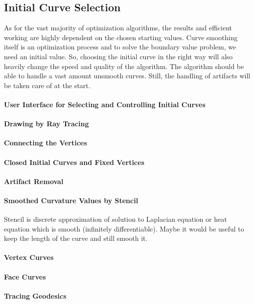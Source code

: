 \documentclass{stdlocal}
\begin{document}
\subsection{Initial Curve Selection} %
\label{sub:initial_curve_selection}
  As for the vast majority of optimization algorithms, the results and efficient working are highly dependent on the chosen starting values.
  Curve smoothing itself is an optimization process and to solve the boundary value problem, we need an initial value.
  So, choosing the initial curve in the right way will also heavily change the speed and quality of the algorithm.
  The algorithm should be able to handle a vast amount unsmooth curves.
  Still, the handling of artifacts will be taken care of at the start.
  \paragraph{User Interface for Selecting and Controlling Initial Curves}
  \paragraph{Drawing by Ray Tracing}
  \paragraph{Connecting the Vertices}
  \paragraph{Closed Initial Curves and Fixed Vertices}
  \paragraph{Artifact Removal}
  \paragraph{Smoothed Curvature Values by Stencil}
    Stencil is discrete approximation of solution to Laplacian equation or heat equation which is smooth (infinitely differentiable).
    Maybe it would be useful to keep the length of the curve and still smooth it.
  \paragraph{Vertex Curves}
  \paragraph{Face Curves}
  \paragraph{Tracing Geodesics}
\end{document}
